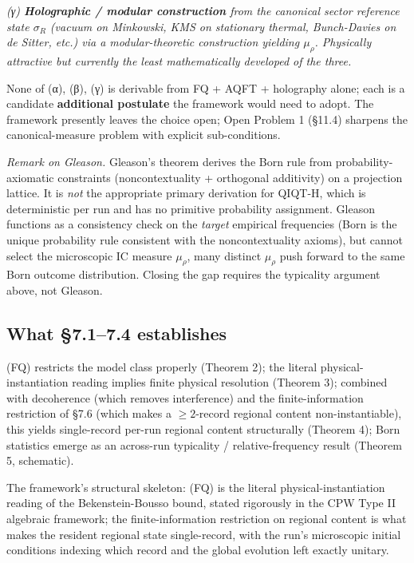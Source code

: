 \documentclass[11pt,a4paper]{article}
\begin{document}
\emph{(γ) \textbf{Holographic / modular construction} from the canonical sector reference state $\sigma_R$ (vacuum on Minkowski, KMS on stationary thermal, Bunch-Davies on de Sitter, etc.) via a modular-theoretic construction yielding $\mu_\rho$. Physically attractive but currently the least mathematically developed of the three.}

None of (α), (β), (γ) is derivable from FQ + AQFT + holography alone; each is a candidate \textbf{additional postulate} the framework would need to adopt. The framework presently leaves the choice open; Open Problem 1 (§11.4) sharpens the canonical-measure problem with explicit sub-conditions.

\emph{Remark on Gleason.} Gleason's theorem derives the Born rule from probability-axiomatic constraints (noncontextuality + orthogonal additivity) on a projection lattice. It is \emph{not} the appropriate primary derivation for QIQT-H, which is deterministic per run and has no primitive probability assignment. Gleason functions as a consistency check on the \emph{target} empirical frequencies (Born is the unique probability rule consistent with the noncontextuality axioms), but cannot select the microscopic IC measure $\mu_\rho$, many distinct $\mu_\rho$ push forward to the same Born outcome distribution. Closing the gap requires the typicality argument above, not Gleason.

\subsection{What §7.1–7.4 establishes}

(FQ) restricts the model class properly (Theorem 2); the literal physical-instantiation reading implies finite physical resolution (Theorem 3); combined with decoherence (which removes interference) and the finite-information restriction of §7.6 (which makes a $\ge 2$-record regional content non-instantiable), this yields single-record per-run regional content structurally (Theorem 4); Born statistics emerge as an across-run typicality / relative-frequency result (Theorem 5, schematic).

The framework's structural skeleton: (FQ) is the literal physical-instantiation reading of the Bekenstein-Bousso bound, stated rigorously in the CPW Type II algebraic framework; the finite-information restriction on regional content is what makes the resident regional state single-record, with the run's microscopic initial conditions indexing which record and the global evolution left exactly unitary.
\end{document}
